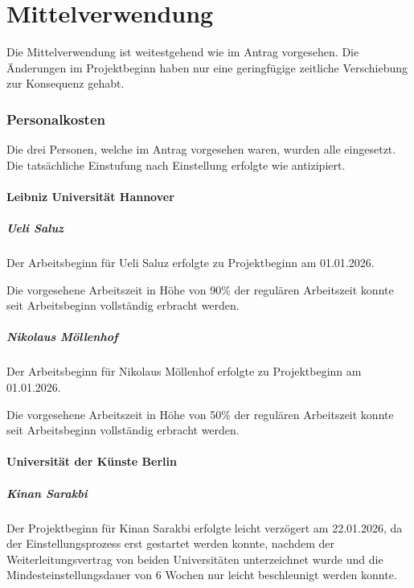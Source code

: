 \documentclass[type=zwischenbericht]{zukunftbau}
\begin{document}
\part{Mittelverwendung}

Die Mittelverwendung ist weitestgehend wie im Antrag vorgesehen. Die Änderungen im Projektbeginn haben nur eine geringfügige zeitliche Verschiebung zur Konsequenz gehabt.

\section{Personalkosten}

Die drei Personen, welche im Antrag vorgesehen waren, wurden alle eingesetzt. Die tatsächliche Einstufung nach Einstellung erfolgte wie antizipiert.

\subsection{Leibniz Universität Hannover}

\subsubsection{Ueli Saluz}
Der Arbeitsbeginn für Ueli Saluz erfolgte zu Projektbeginn am 01.01.2026.

Die vorgesehene Arbeitszeit in Höhe von 90\% der regulären Arbeitszeit konnte seit Arbeitsbeginn vollständig erbracht werden.

\subsubsection{Nikolaus Möllenhof}
Der Arbeitsbeginn für Nikolaus Möllenhof erfolgte zu Projektbeginn am 01.01.2026.

Die vorgesehene Arbeitszeit in Höhe von 50\% der regulären Arbeitszeit konnte seit Arbeitsbeginn vollständig erbracht werden.

\subsection{Universität der Künste Berlin}

\subsubsection{Kinan Sarakbi}
Der Projektbeginn für Kinan Sarakbi erfolgte leicht verzögert am 22.01.2026, da der Einstellungsprozess erst gestartet werden konnte, nachdem der Weiterleitungsvertrag von beiden Universitäten unterzeichnet wurde und die Mindesteinstellungsdauer von 6 Wochen nur leicht beschleunigt werden konnte.
\end{document}
